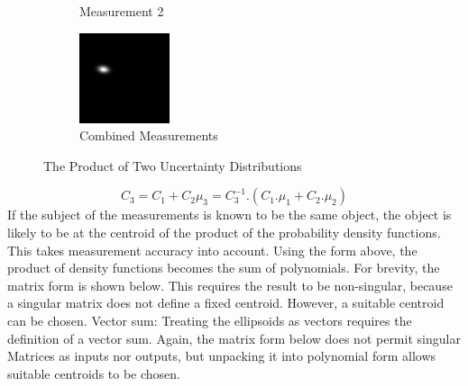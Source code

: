 \documentclass[a4paper, 11pt, titlepage]{article}
\begin{document}
\begin{figure}
\begin{subfigure}{.3\textwidth}
        \caption{Measurement 2}
        \label{fig:uncProdsub2}
      \end{subfigure}
      \begin{subfigure}{.3\textwidth}
        \centering
        \includegraphics[width=.8\linewidth]{images/GaussianLine3.png}
        \caption{Combined Measurements}
        \label{fig:uncProdsub3}
      \end{subfigure}
      \caption{The Product of Two Uncertainty Distributions}
      \label{fig:uncProd}
      \end{figure}
      \begin{equation}
      C_3 = C_1+C_2
      \mu_3 = C_3^{-1} . (C_1.\mu_1 + C_2.\mu_2)
      \end{equation}
      If the subject of the measurements is known to be the same object, the object is likely to be at the centroid of the product of the probability density functions.  This takes measurement accuracy into account.
      Using the form above, the product of density functions becomes the sum of polynomials.
        For brevity, the matrix form is shown below. This requires the result to be non-singular, because a singular matrix does not define a fixed centroid. However, a suitable centroid can be chosen.
      Vector sum:
        Treating the ellipsoids as vectors requires the definition of a vector sum.
        Again, the matrix form below does not permit singular Matrices as inputs nor outputs, but unpacking it into polynomial form allows suitable centroids to be chosen.
\end{document}
